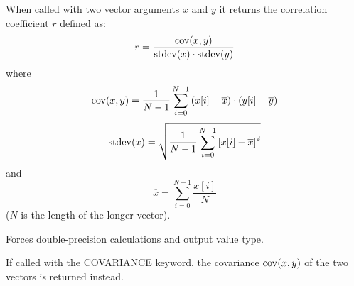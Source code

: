 When called with two vector arguments $x$ and $y$ it returns 
  the correlation coefficient $r$ defined as:
\begin{equation}
  r = \frac{{\rm cov}(x,y)}{{\rm stdev}(x) \cdot {\rm stdev}(y)}
\end{equation}
where
\begin{equation}
  {\rm cov}(x,y) = \frac{1}{N - 1} \sum\limits_{i=0}^{N-1} 
    \left( x[i] - \overline{x} \right) \cdot
    \left( y[i] - \overline{y} \right)
\end{equation}
\begin{equation}
  {\rm stdev}(x) = \sqrt{
    \frac{1}{N - 1} \sum\limits_{i=0}^{N-1} \left[ 
      x[i] - \overline{x}
    \right]^2
  }
\end{equation}
and 
\begin{equation}
  \overline{x} = \sum\limits_{i=0}^{N-1} \frac{x[i]}{N}
\end{equation}
($N$ is the length of the longer vector).



Forces double-precision calculations and output value type.



If called with the COVARIANCE keyword, the covariance ${\rm cov}(x,y)$ 
  of the two vectors is returned instead.


